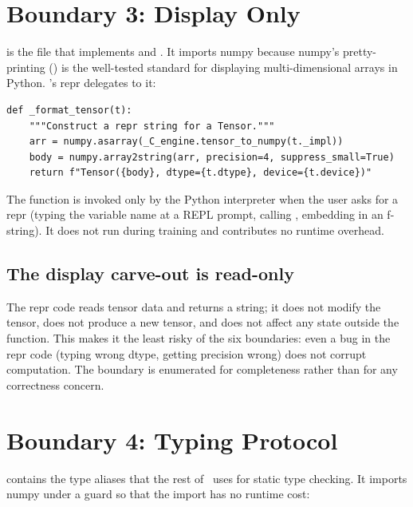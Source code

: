 \section{Boundary 3: Display Only}
\label{sec:bridge_boundaries:b3}

 is the file that implements
 and . It
imports numpy because numpy's pretty-printing
() is the well-tested standard for
displaying multi-dimensional arrays in Python. \Lucid's repr
delegates to it:

\begin{lstlisting}[style=lucid,language=LucidPython]
def _format_tensor(t):
    """Construct a repr string for a Tensor."""
    arr = numpy.asarray(_C_engine.tensor_to_numpy(t._impl))
    body = numpy.array2string(arr, precision=4, suppress_small=True)
    return f"Tensor({body}, dtype={t.dtype}, device={t.device})"
\end{lstlisting}

The function is invoked only by the Python interpreter when the
user asks for a repr (typing the variable name at a REPL prompt,
calling , embedding in an f-string). It does not run
during training and contributes no runtime overhead.

\subsection{The display carve-out is read-only}
\label{ssec:bridge_boundaries:repr_readonly}

The repr code reads tensor data and returns a string; it does not
modify the tensor, does not produce a new tensor, and does not
affect any state outside the function. This makes it the least
risky of the six boundaries: even a bug in the repr code (typing
wrong dtype, getting precision wrong) does not corrupt
computation. The boundary is enumerated for completeness rather
than for any correctness concern.

\section{Boundary 4: Typing Protocol}
\label{sec:bridge_boundaries:b4}

 contains the type aliases that the rest of
\Lucid\ uses for static type checking. It imports numpy under a
 guard so that the import has no runtime cost:

